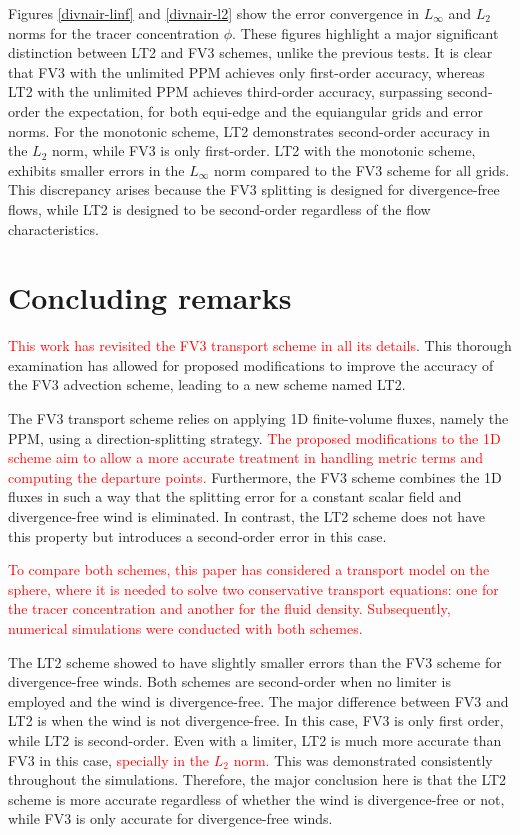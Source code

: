 \documentclass[preprint,12pt]{elsarticle}
\begin{document}
\begin{linenumbers}
Figures \ref{divnair-linf} and \ref{divnair-l2} show the error convergence in $L_{\infty}$ and $L_{2}$ norms for the tracer concentration $\phi$.
These figures highlight a major significant distinction between LT2 and FV3 schemes, unlike the previous tests.
It is clear that FV3 with the unlimited PPM achieves only first-order accuracy, whereas LT2 with the unlimited PPM achieves third-order accuracy, 
surpassing second-order the expectation, for both equi-edge and the equiangular grids and error norms.
For the monotonic scheme, LT2 demonstrates second-order accuracy in the $L_2$ norm, while FV3 is only first-order.
LT2 with the monotonic scheme, exhibits smaller errors in the $L_{\infty}$ norm compared to the FV3 scheme for all grids.
This discrepancy arises because the FV3 splitting is designed for divergence-free flows, while LT2 is designed to be second-order regardless of the flow characteristics.

\section{Concluding remarks}
\label{conclusion}
\textcolor{red}{This work has revisited the FV3 transport scheme in all its details}. This thorough examination has allowed for proposed modifications to improve the accuracy of the FV3 advection scheme, leading to a new scheme named LT2.

The FV3 transport scheme relies on applying 1D finite-volume fluxes, namely the PPM, using a direction-splitting strategy.
\textcolor{red}{The proposed modifications to the 1D scheme aim to allow a more accurate treatment in handling metric terms and computing the departure points.}
Furthermore, the FV3 scheme combines the 1D fluxes in such a way that the splitting error for a constant scalar field and divergence-free wind is eliminated.
In contrast, the LT2 scheme does not have this property but introduces a second-order error in this case.

\textcolor{red}{To compare both schemes, this paper has considered a transport model on the sphere, where it is needed to solve two conservative transport equations: one for the tracer concentration and another for the fluid density. 
Subsequently, numerical simulations were conducted with both schemes.}

The LT2 scheme showed to  have slightly smaller errors than the FV3 scheme for divergence-free winds.
Both schemes are second-order when no limiter is employed and the wind is divergence-free.
The major difference between FV3 and LT2 is when the wind is not divergence-free.
In this case, FV3 is only first order, while LT2 is second-order. Even with a limiter, LT2 is much more accurate than FV3 in this case, \textcolor{red}{specially in the $L_2$ norm.}
This was demonstrated consistently throughout the simulations.
Therefore, the major conclusion here is that the LT2 scheme is more accurate regardless of whether the wind is divergence-free or not, while FV3 is only accurate for divergence-free winds.


\end{linenumbers}
\end{document}
